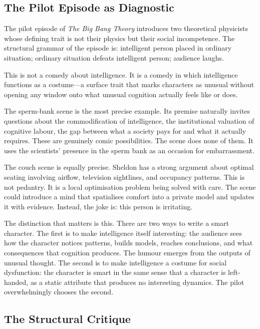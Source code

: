 \documentclass[12pt, letterpaper]{article}
\theoremstyle{remark}
\newcommand{\BBT}{\textit{The Big Bang Theory}}
\begin{document}
\subsection{The Pilot Episode as Diagnostic}

The pilot episode of \BBT{} introduces two theoretical physicists whose
defining trait is not their physics but their social incompetence.  The
structural grammar of the episode is: intelligent person placed in ordinary
situation; ordinary situation defeats intelligent person; audience laughs.

This is not a comedy about intelligence.  It is a comedy in which
intelligence functions as a costume---a surface trait that marks characters
as unusual without opening any window onto what unusual cognition actually
feels like or does.

The sperm-bank scene is the most precise example.  Its premise naturally
invites questions about the commodification of intelligence, the institutional
valuation of cognitive labour, the gap between what a society pays for and
what it actually requires.  These are genuinely comic possibilities.  The
scene does none of them.  It uses the scientists' presence in the sperm bank
as an occasion for embarrassment.

The couch scene is equally precise.  Sheldon has a strong argument about
optimal seating involving airflow, television sightlines, and occupancy
patterns.  This is not pedantry.  It is a local optimisation problem being
solved with care.  The scene could introduce a mind that spatialises comfort
into a private model and updates it with evidence.  Instead, the joke is:
this person is irritating.

The distinction that matters is this.  There are two ways to write a smart
character.  The first is to make intelligence itself interesting: the
audience sees how the character notices patterns, builds models, reaches
conclusions, and what consequences that cognition produces.  The humour
emerges from the outputs of unusual thought.  The second is to make
intelligence a costume for social dysfunction: the character is smart in
the same sense that a character is left-handed, as a static attribute that
produces no interesting dynamics.  The pilot overwhelmingly chooses the second.

\subsection{The Structural Critique}
\end{document}
